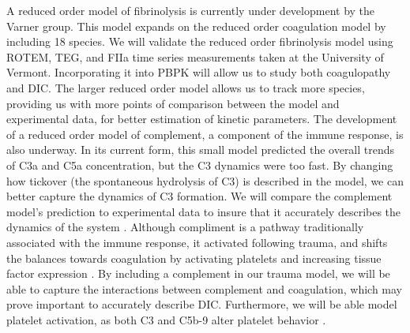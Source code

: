 \documentclass[11pt]{article}
\begin{document}
A reduced order model of fibrinolysis is currently under development by the Varner group. This model expands on the reduced order coagulation model by including 18 species. We will validate the reduced order fibrinolysis model using ROTEM, TEG, and FIIa time series measurements taken at the University of Vermont. Incorporating it into PBPK will allow us to study both coagulopathy and DIC. The larger reduced order model allows us to track more species, providing us with more points of comparison between the model and experimental data, for better estimation of kinetic parameters. The development of a reduced order model of complement, a component of the immune response, is also underway. In its current form, this small model predicted the overall trends of C3a and C5a concentration, but the C3 dynamics were too fast. By changing how tickover (the spontaneous hydrolysis of C3) is described in the model, we can better capture the dynamics of C3 formation.  We will compare the complement model's prediction to experimental data to insure that it accurately describes the dynamics of the system \cite{morad2015time}. Although compliment is a pathway traditionally associated with the immune response, it activated following trauma, and shifts the balances towards coagulation by activating platelets and increasing tissue factor expression \cite{markiewski2007complement}. By including a complement in our trauma model, we will be able to capture the interactions between complement and coagulation, which may prove important to accurately describe DIC. Furthermore, we will be able model platelet activation, as both C3 and C5b-9 alter platelet behavior \cite{peerschke2008platelet}.
\end{document}
